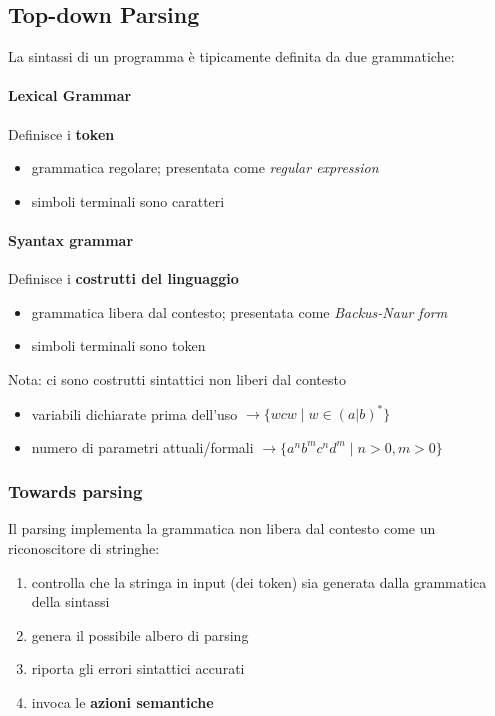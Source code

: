 \subsection{Top-down Parsing}
La sintassi di un programma \`e tipicamente definita da due grammatiche:
\paragraph{Lexical Grammar}
Definisce i \textbf{token}
\begin{itemize}
\item grammatica regolare; presentata come \textit{regular expression}
\item simboli terminali sono caratteri
\end{itemize}
\paragraph{Syantax grammar}
Definisce i \textbf{costrutti del linguaggio}
\begin{itemize}
\item grammatica libera dal contesto; presentata come \textit{Backus-Naur form}
\item simboli terminali sono token
\end{itemize}

Nota: ci sono costrutti sintattici non liberi dal contesto
\begin{itemize}
\item variabili dichiarate prima dell'uso $\to \{wcw \mid w \in (a|b)^*\}$
\item numero di parametri attuali/formali $\to \{a^nb^mc^nd^m \mid n>0,m>0\}$
\end{itemize}

\subsubsection{Towards parsing}
Il parsing implementa la grammatica non libera dal contesto come un
riconoscitore di stringhe:
\begin{enumerate}
\item controlla che la stringa in input (dei token) sia generata dalla
grammatica della sintassi
\item genera il possibile albero di parsing
\item riporta gli errori sintattici accurati
\item invoca le \textbf{azioni semantiche}
\end{enumerate}

